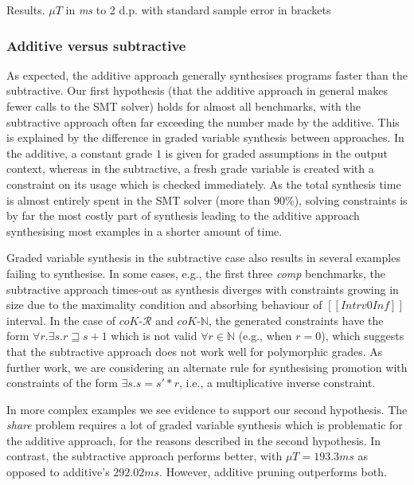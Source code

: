 \begin{table}[t]
\caption{Results. $\mu{T}$ in \emph{ms} to 2 d.p.
with standard sample error in brackets}
\label{tab:results}
\vspace{-2.5em}
\end{table}



\subsubsection{Additive versus subtractive}
As expected, the additive approach generally synthesises programs faster
than the subtractive. Our first hypothesis (that the additive approach in general
makes fewer calls to the SMT solver) holds for almost all benchmarks, with the
subtractive approach often far exceeding the number made by the additive. This is explained by
the difference in graded variable synthesis between approaches. In the
additive, a constant grade $1$ is given for graded assumptions in the output
context, whereas in the subtractive, a fresh grade
variable is created with a constraint on its usage which
is checked immediately. As the
total synthesis time is almost entirely spent in the SMT solver (more than 90\%), solving constraints is by far the most costly part of synthesis
leading to the additive approach synthesising most examples in a shorter amount of time.

Graded variable synthesis in the subtractive case also results
in several examples failing to synthesise. In some cases, e.g.,
the first three \textit{comp} benchmarks, the subtractive approach
times-out as synthesis diverges with constraints growing in size
due to the maximality condition and absorbing behaviour of
$[[ Intrv 0 Inf ]]$ interval. In the case of $\textit{coK-$\mathcal{R}$}$
and $\textit{coK-$\mathbb{N}$}$, the generated constraints
have the form $\forall r. \exists s. r \sqsupseteq s + 1 $ which
is not valid $\forall r \in \mathbb{N}$ (e.g., when $r = 0$),
which suggests that the subtractive approach does not work well for
polymorphic grades. As further work, we are
considering an alternate rule for synthesising promotion with
constraints of the form $\exists s . s = s' * r$, i.e.,
a multiplicative inverse constraint.

In more complex examples we see evidence to support
our second hypothesis. The \textit{share} problem requires a lot
of graded variable synthesis which is problematic for the additive
approach, for the reasons described in the second hypothesis. In contrast, the subtractive approach
performs better, with $\mu{T} = 193.3\textit{ms}$ as opposed to additive's
$292.02\textit{ms}$. However, additive pruning outperforms both.

